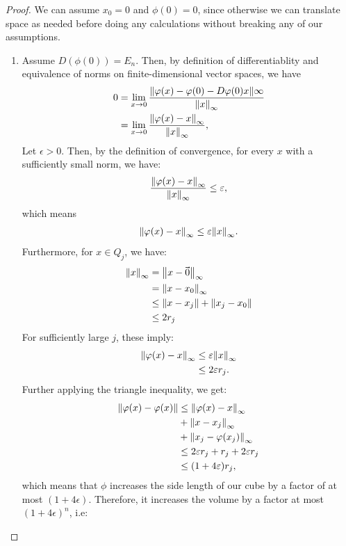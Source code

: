 \begin{proof}
	We can assume $x_0 = 0$ and $\phi(0) = 0$, since otherwise we can translate space as needed before doing any calculations without breaking any of our assumptions.
	\begin{enumerate}
		\item  Assume $D(\phi(0)) = E_n$. Then, by definition of differentiablity and equivalence of norms on finite-dimensional vector spaces, we have
		\begin{align*}
			0 &= \lim_{x \to 0}
			\frac{\norm{\varphi(x) - \varphi(0) - D\varphi(0)x}\infty}{\norm{x}_\infty}\\
			&= \lim_{x \to 0} \frac{\norm{\varphi(x) - x}_\infty}{\norm{x}_\infty},
		\end{align*}
		Let $\epsilon > 0$. Then, by the definition of convergence, for every $x$ with a sufficiently small norm, we have:
		\begin{align*}
			\frac{\norm{\varphi(x) - x}_\infty}{\norm{x}_\infty} \leq \varepsilon,
		\end{align*}
		which means
		\begin{align*}
			\norm{\varphi(x) - x}_\infty \leq \varepsilon{\norm{x}_\infty}.
		\end{align*}
		Furthermore, for $x \in Q_j$, we have:
		\begin{align*}
			\norm{x}_\infty 
			&= \norm{x - \kern-1.2pt\vec{\kern1.2pt 0}}_\infty\\
			&= \norm{x - x_0}_\infty\\
			&\leq \norm{x - x_j}
			+ \norm{x_j - x_0}\\
			&\leq 2r_j
		\end{align*}
		For sufficiently large $j$, these imply:
		\begin{align*}
			\norm{\varphi(x) - x}_\infty &\leq \varepsilon \norm{x}_\infty\\
			&\leq 2\varepsilon r_j.
		\end{align*}
		Further applying the triangle inequality, we get:
		\begin{align*}
			\norm{\varphi(x) - \varphi(x)}
			&\leq \norm{\varphi(x) - x}_\infty\\
			&+ \norm{x - x_j}_\infty\\
			&+ \norm{x_j - \varphi(x_j)}_\infty\\
			&\leq 2\varepsilon r_j + r_j + 2\varepsilon r_j\\
			&\leq (1 + 4\varepsilon)r_j,
		\end{align*}
		which means that $\phi$ increases the side length of our cube by a factor of at most $(1 + 4\epsilon)$. Therefore, it increases the volume by a factor at most $(1 + 4\epsilon)^n$, i.e:

\end{enumerate}
\end{proof}
